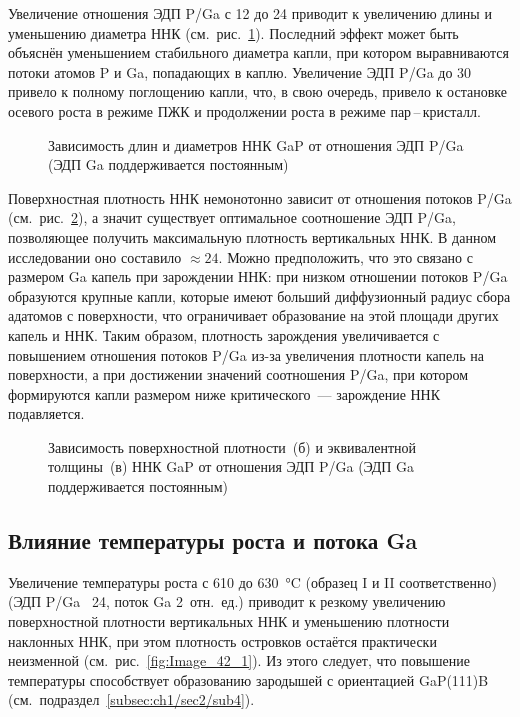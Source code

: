 Увеличение отношения ЭДП P/Ga с 12 до 24 приводит к увеличению длины и
уменьшению диаметра ННК (см.~рис.~\cref{fig:Image_41_1}). Последний эффект
может быть объяснён уменьшением стабильного диаметра капли, при котором
выравниваются потоки атомов P и Ga, попадающих в каплю. Увеличение ЭДП P/Ga до
30 привело к полному поглощению капли, что, в свою очередь, привело к остановке
осевого роста в режиме ПЖК и продолжении роста в режиме пар\,--\,кристалл.

\begin{figure}[ht]  \caption{Зависимость длин и
		диаметров ННК GaP от отношения ЭДП P/Ga (ЭДП Ga поддерживается
постоянным)}\label{fig:Image_41_1} \end{figure}

Поверхностная плотность ННК немонотонно зависит от отношения потоков P/Ga
(см.~рис.~\cref{fig:Image_41_23}), а значит существует оптимальное соотношение
ЭДП P/Ga, позволяющее получить максимальную плотность вертикальных ННК. В
данном исследовании оно составило \(\approx 24\). Можно предположить, что это
связано с размером Ga капель при зарождении ННК: при низком отношении потоков
P/Ga образуются крупные капли, которые имеют больший диффузионный радиус сбора
адатомов с поверхности, что ограничивает образование на этой площади других
капель и ННК. Таким образом, плотность зарождения увеличивается с повышением
отношения потоков P/Ga из-за увеличения плотности капель на поверхности, а при
достижении значений соотношения P/Ga, при котором формируются капли размером
ниже критического~--- зарождение ННК подавляется.

\begin{figure}[ht] 
	\caption{Зависимость поверхностной плотности~(б) и эквивалентной
		толщины~(в) ННК GaP от отношения ЭДП P/Ga (ЭДП Ga поддерживается
постоянным)}\label{fig:Image_41_23} \end{figure}

\subsection{Влияние температуры роста и потока Ga}\label{subsec:ch6/sec2/sub4}

Увеличение температуры роста с 610 до 630~\si{\degreeCelsius} (образец I и II
соответственно) (ЭДП P/Ga ~24, поток Ga 2~отн.~ед.) приводит к резкому
увеличению поверхностной плотности вертикальных ННК и уменьшению плотности
наклонных ННК, при этом плотность островков остаётся практически неизменной
(см.~рис.~\cref{fig:Image_42_1}). Из этого следует, что повышение температуры
способствует образованию зародышей с ориентацией GaP(111)B
(см.~подраздел~\cref{subsec:ch1/sec2/sub4}).

